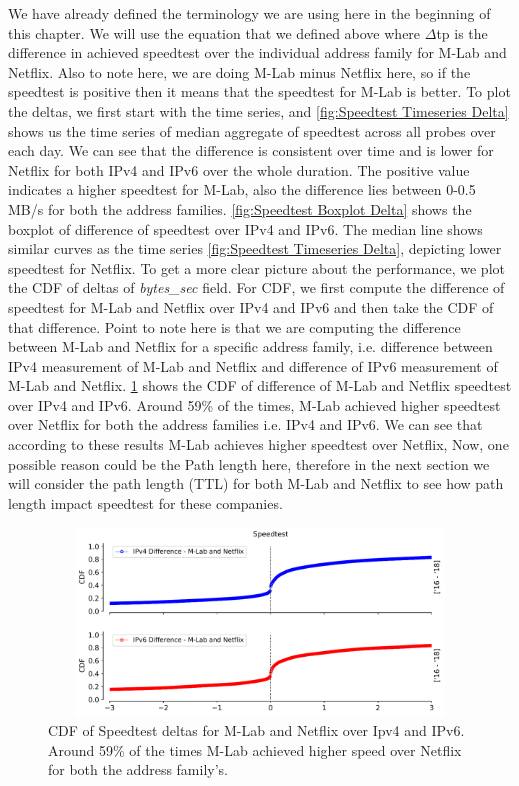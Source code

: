 We have already defined the terminology we are using here in the beginning of this chapter. We will use the equation that we defined above where $\Delta$tp is the difference in achieved speedtest
over the individual address family for M-Lab and Netflix. Also to note here, we are doing M-Lab minus Netflix here, so if the speedtest is positive then it means that the speedtest for M-Lab is better.
To plot the deltas, we first start with the time series, and \cref{fig:Speedtest Timeseries Delta} shows us the time series of median aggregate of speedtest across all probes over each day.
We can see that the difference is consistent over time and is lower for Netflix for both IPv4 and IPv6 over the whole duration. The positive value indicates a higher speedtest for M-Lab, also the difference lies between 0-0.5 MB/s for both the address families.
\cref{fig:Speedtest Boxplot Delta} shows the boxplot of difference of speedtest over IPv4 and IPv6. The median line shows similar curves as the time series \cref{fig:Speedtest Timeseries Delta}, depicting lower speedtest for Netflix.
To get a more clear picture about the performance, we plot the CDF of deltas of \textit{bytes\_sec} field. For CDF, we first compute the difference of speedtest for M-Lab and Netflix over IPv4 and IPv6 and then take the CDF of that difference.
Point to note here is that we are computing the difference between M-Lab and Netflix for a specific address family, i.e. difference between IPv4 measurement of M-Lab and Netflix and difference of IPv6 measurement
of M-Lab and Netflix.
\cref{fig:Speedtest CDF Delta} shows the CDF of difference of M-Lab and Netflix speedtest over IPv4 and IPv6. Around 59\% of the times, M-Lab achieved higher speedtest over Netflix for both the address families i.e. IPv4 and IPv6. We can see that according to these results M-Lab achieves higher speedtest over Netflix, Now,
one possible reason could be the Path length here, therefore in the next section we will consider the path length (TTL) for both M-Lab and Netflix to see how path length impact speedtest for these companies.

\begin{figure}[!ht]
	\centering
	\includegraphics[keepaspectratio, height=5cm, width=15cm]{figures/mlab/netflix-throughput-difference-speedtest.pdf}
	\caption[Speedtest CDF delta]{CDF of Speedtest deltas for M-Lab and Netflix over Ipv4 and IPv6. Around 59\% of the times M-Lab achieved higher speed over Netflix for both the address family's.}
	\label{fig:Speedtest CDF Delta}
\end{figure}

